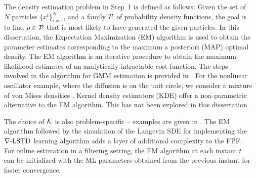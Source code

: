 The density estimation problem in Step~1 is defined as follows: Given the set of $N$ particles $\{x^i\}_{i=1}^N$, and a family ${\cal P} $ of probability density functions,  the goal is to find $\rho \in {\cal P} $ that is most likely to have generated the given particles.  In this dissertation, the Expectation Maximization (EM) algorithm is used to obtain the parameter estimates corresponding to the maximum a posteriori (MAP) optimal density. The EM algorithm is an iterative procedure to obtain the maximum-likelihood estimates of an analytically intractable cost function. The steps involved in the algorithm for GMM estimation is provided in . For the nonlinear oscillator example, where the diffusion is on the unit circle, we consider a mixture of von Mises densities \cite{haspea00}. Kernel density estimators (KDE) offer a non-parametric alternative to the EM algorithm. This has not been explored in this dissertation. 

The choice of ${\cal K}$ is also problem-specific -- examples are given in . The EM algorithm followed by the simulation of the Langevin SDE for implementing the $\nabla\text{-LSTD}$ learning algorithm adds a layer of additional complexity to the FPF. For online estimation in a filtering setting, the EM algorithm at each instant $t$ can be initialized with the ML parameters obtained from the previous instant for faster convergence.   

